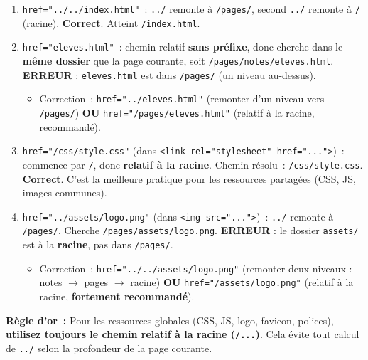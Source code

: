 \documentclass[11pt]{article}
\begin{document}
\begin{exoresolu}
\begin{enumerate}
    \item \texttt{href="../../index.html"}~: \texttt{../} remonte à \texttt{/pages/}, second \texttt{../} remonte à \texttt{/} (racine). \textbf{Correct}. Atteint \texttt{/index.html}.
    \item \texttt{href="eleves.html"}~: chemin relatif \textbf{sans préfixe}, donc cherche dans le \textbf{même dossier} que la page courante, soit \texttt{/pages/notes/eleves.html}. \textbf{ERREUR} : \texttt{eleves.html} est dans \texttt{/pages/} (un niveau au-dessus).
        \begin{itemize}
            \item Correction~: \texttt{href="../eleves.html"} (remonter d'un niveau vers \texttt{/pages/}) \textbf{OU} \texttt{href="/pages/eleves.html"} (relatif à la racine, recommandé).
        \end{itemize}
    \item \texttt{href="/css/style.css"} (dans \texttt{<link rel="stylesheet" href="...">})~: commence par \texttt{/}, donc \textbf{relatif à la racine}. Chemin résolu~: \texttt{/css/style.css}. \textbf{Correct}. C'est la meilleure pratique pour les ressources partagées (CSS, JS, images communes).
    \item \texttt{href="../assets/logo.png"} (dans \texttt{<img src="...">})~: \texttt{../} remonte à \texttt{/pages/}. Cherche \texttt{/pages/assets/logo.png}. \textbf{ERREUR} : le dossier \texttt{assets/} est à la \textbf{racine}, pas dans \texttt{/pages/}.
        \begin{itemize}
            \item Correction~: \texttt{href="../../assets/logo.png"} (remonter deux niveaux : notes $\to$ pages $\to$ racine) \textbf{OU} \texttt{href="/assets/logo.png"} (relatif à la racine, \textbf{fortement recommandé}).
        \end{itemize}
\end{enumerate}

\textbf{Règle d'or~:} Pour les ressources globales (CSS, JS, logo, favicon, polices), \textbf{utilisez toujours le chemin relatif à la racine (\texttt{/...})}. Cela évite tout calcul de \texttt{../} selon la profondeur de la page courante.
\end{exoresolu}
\end{document}
